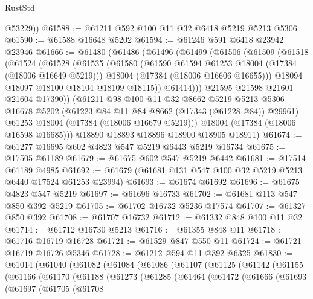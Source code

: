 \begin{lexlean}{RustStd}
\begin{coremodule}
        @53229))
@61588 := @61211 @592 @100 @11 @32 @6418 @5219 @5213 @5306
@61590 := @61588 @16648 @5202
@61594 := @61246 @591 @6418 @23942 @23946
@61666 := @61480
    (@61486
      (@61496
        (@61499
          (@61506
            (@61509
              (@61518
                (@61524
                  (@61528
                    (@61535
                      (@61580
                        (@61590 @61594 @61253 @18004 (@17384 (@18006 @16649 @5219)))
                        @18004
                        (@17384 (@18006 @16606 @16655)))
                      @18094
                      @18097
                      @18100
                      @18104
                      @18109
                      @18115))
                  @61414)))
            @21595
            @21598
            @21601
            @21604
            @17390))
        (@61211
          @98
          @100
          @11
          @32
          @8662
          @5219
          @5213
          @5306
          @16678
          @5202
          (@61223 @84 @11 @84 @8662 (@17343 (@61228 @84)) @29961)
          @61253
          @18004
          (@17384 (@18006 @16679 @5219)))
        @18004
        (@17384 (@18006 @16598 @16685)))
      @18890
      @18893
      @18896
      @18900
      @18905
      @18911)
@61674 := @61277 @16695 @602 @4823 @547 @5219 @6443 @5219 @16734
@61675 := @17505 @61189
@61679 := @61675 @602 @547 @5219 @6442
@61681 := @17514 @61189 @4985
@61692 := @61679 (@61681 @131 @547 @100 @32 @5219 @5213 @6440 @17524 @61253 @23994)
@61693 := @61674 @61692
@61696 := @61675 @4823 @547 @5219
@61697 := @61696 @16733
@61702 := @61681 @113 @547 @850 @392 @5219
@61705 := @61702 @16732 @5236 @17574
@61707 := @61327 @850 @392
@61708 := @61707 @16732
@61712 := @61332 @848 @100 @11 @32
@61714 := @61712 @16730 @5213
@61716 := @61355 @848 @11
@61718 := @61716 @16719 @16728
@61721 := @61529 @847 @550 @11
@61724 := @61721 @16719 @16726 @5346
@61728 := @61212 @594 @11 @392 @6325
@61830 := @61014
    (@61040
      (@61082
        (@61084
          (@61086
            (@61107
              (@61125
                (@61142
                  (@61155
                    (@61166
                      (@61170
                        (@61188
                          (@61273
                            (@61285
                              (@61464
                                (@61472
                                  (@61666
                                    (@61693
                                      (@61697
                                        (@61705
                                          (@61708

\end{coremodule}
\end{lexlean}

